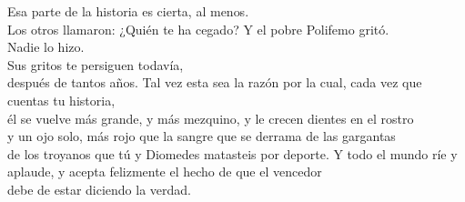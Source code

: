 \begin{versopropio}
\stanzabreak
Esa parte de la historia es cierta, al menos.\\
Los otros llamaron: ¿Quién te ha cegado? Y el pobre Polifemo gritó.\\
Nadie lo hizo.\\
Sus gritos te persiguen todavía,\\
después de tantos años.
\stanzabreak
Tal vez esta sea la razón por la cual, cada vez que cuentas tu historia,\\
él se vuelve más grande, y más mezquino, y le crecen dientes en el rostro\\
y un ojo solo, más rojo que la sangre que se derrama de las gargantas\\
de los troyanos que tú y Diomedes matasteis por deporte.
\stanzabreak
Y todo el mundo ríe y aplaude, y acepta felizmente el hecho de que el vencedor\\
debe de estar diciendo la verdad.
\end{versopropio}
